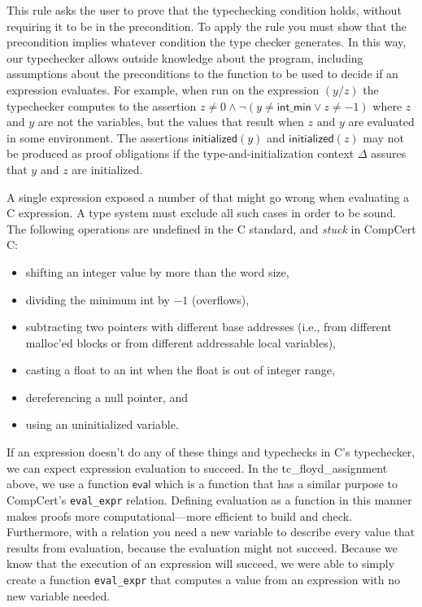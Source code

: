 \documentclass{puthesis}
\begin{document}
This rule asks the user to prove that the typechecking condition
holds, without requiring it to be in the precondition.  To apply the
rule you must show that the precondition implies whatever condition
the type checker generates. In this way, our typechecker allows
outside knowledge about the program, including assumptions about the
preconditions to the function to be used to decide if an expression
evaluates.  For example, when run on the expression $(y/z)$ the
typechecker computes to the assertion $z \not= 0 \wedge \neg (y \not=
\mathsf{int\_min} \vee z \not= -1)$ where $z$ and $y$ are not the
variables, but the values that result when $z$ and $y$ are evaluated
in some environment. The assertions $\mathsf{initialized}(y)$ and
$\mathsf{initialized}(z)$ may not be produced as proof obligations if
the type-and-initialization context $\Delta$ assures that $y$ and $z$
are initialized.

A single expression exposed a number of that might go wrong when
evaluating a C expression. A type system must exclude all such cases
in order to be sound. The following operations are undefined in the C
standard, and \emph{stuck} in CompCert C:
\begin {itemize}
  \item shifting an integer value by more than the word size,
  \item dividing the minimum int by $-1$  (overflows),
  \item subtracting two pointers with different base addresses (i.e.,
from different malloc'ed blocks or from different addressable local
variables),
  \item casting a float to an int when the float is out of integer range,
  \item dereferencing a null pointer, and
  \item using an uninitialized variable.
\end{itemize}

If an expression doesn't do any of these things and typechecks in C's
typechecker, we can expect expression evaluation to succeed. In the
tc\_floyd\_assignment above, we use a function $\mathsf{eval}$ which
is a function that has a similar purpose to CompCert's
\lstinline|eval_expr| relation.  Defining evaluation as a function in
this manner makes proofs more computational---more efficient to build
and check. Furthermore, with a relation you need a new variable to
describe every value that results from evaluation, because the
evaluation might not succeed. Because we know that the execution of an
expression will succeed, we were able to simply create a function
\lstinline|eval_expr| that computes a value from an expression with no
new variable needed.
\end{document}
